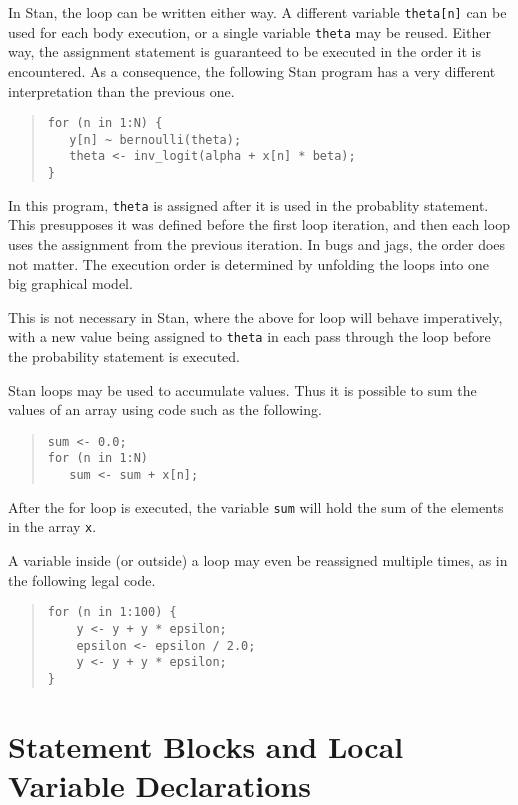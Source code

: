 \documentclass[10pt]{report}
\newcommand{\Stan}{Stan\xspace}
\newcommand{\acronym}[1]{{\sc #1}\xspace}
\newcommand{\BUGS}{\acronym{bugs}}
\newcommand{\JAGS}{\acronym{jags}}
\newcommand{\code}[1]{{\tt #1}}
\begin{document}
In \Stan, the loop can be written either way.  A different variable
\code{theta[n]} can be used for each body execution, or a single
variable \code{theta} may be reused. Either way, the assignment
statement is guaranteed to be executed in the order it is encountered.
As a consequence, the following \Stan program has a very different
interpretation than the previous one.
%
\begin{quote}
\begin{Verbatim}
for (n in 1:N) {
   y[n] ~ bernoulli(theta);
   theta <- inv_logit(alpha + x[n] * beta);
}
\end{Verbatim}
\end{quote}
%
In this program, \code{theta} is assigned after it is used in the
probablity statement.  This presupposes it was defined before the
first loop iteration, and then each loop uses the assignment from the
previous iteration.  In \BUGS and \JAGS, the order does not matter.
The execution order is determined by unfolding the loops into one big
graphical model.

This is not necessary in \Stan, where the above for loop will behave
imperatively, with a new value being assigned to \code{theta} in each
pass through the loop before the probability statement is executed.

\Stan loops may be used to accumulate values.  Thus it is possible to
sum the values of an array using code such as the following.
%
\begin{quote}
\begin{Verbatim}
sum <- 0.0;
for (n in 1:N) 
   sum <- sum + x[n];
\end{Verbatim}
\end{quote}
%
After the for loop is executed, the variable \code{sum} will hold the
sum of the elements in the array \code{x}.

A variable inside (or outside) a loop may even be reassigned multiple
times, as in the following legal code.
%
\begin{quote}
\begin{Verbatim}
for (n in 1:100) {
    y <- y + y * epsilon;
    epsilon <- epsilon / 2.0;
    y <- y + y * epsilon;
}
\end{Verbatim}
\end{quote}
%


\section{Statement Blocks and Local Variable Declarations}
\end{document}
